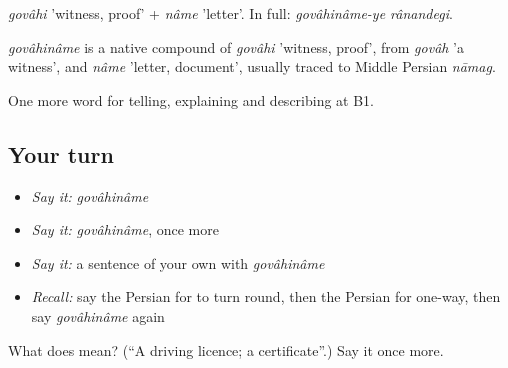 \emph{govâhi} 'witness, proof' + \emph{nâme} 'letter'. In full: \emph{govâhinâme-ye rânandegi}.

\begin{cousinweb}
\emph{govâhinâme} is a native compound of \emph{govâhi} 'witness, proof', from \emph{govâh} 'a witness', and \emph{nâme} 'letter, document', usually traced to Middle Persian \emph{nāmag}.
\end{cousinweb}

\begin{grammarlens}[title={What you've built}]
One more word for telling, explaining and describing at B1.
\end{grammarlens}

\subsection*{Your turn}
\begin{itemize}
\raggedright
  \item \emph{Say it:} \emph{govâhinâme}
  \item \emph{Say it:} \emph{govâhinâme}, once more
  \item \emph{Say it:} a sentence of your own with \emph{govâhinâme}
  \item \emph{Recall:} say the Persian for to turn round, then the Persian for one-way, then say \emph{govâhinâme} again
\end{itemize}

\begin{tcolorbox}[breakable,colback=teal!4,colframe=teal!35!black,title={Before you move on}]
What does  mean? (\textquotedblleft{}A driving licence; a certificate\textquotedblright{}.) Say it once more.
\end{tcolorbox}

